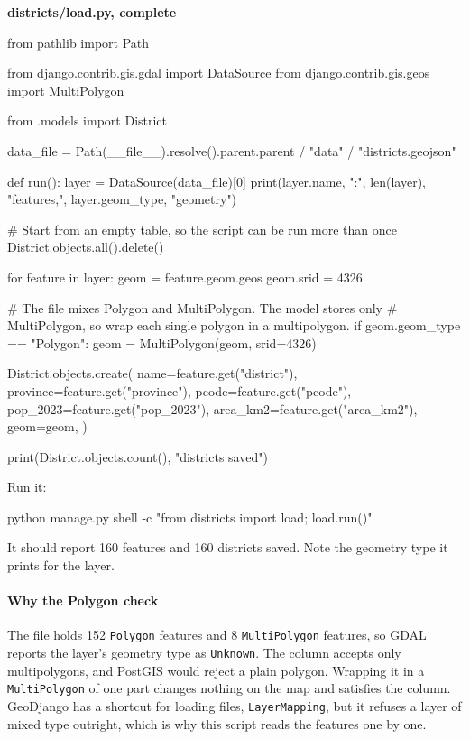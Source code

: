 \documentclass{article}
\newcommand{\cd}[1]{\texttt{#1}}
\newcommand{\codecap}[1]{%
  \par\vspace{.9em}\noindent\textbf{#1}\par\vspace{-.6em}}
\begin{document}
\codecap{districts/load.py, complete}
\begin{code}
from pathlib import Path

from django.contrib.gis.gdal import DataSource
from django.contrib.gis.geos import MultiPolygon

from .models import District

data_file = Path(__file__).resolve().parent.parent / "data" / "districts.geojson"


def run():
    layer = DataSource(data_file)[0]
    print(layer.name, ":", len(layer), "features,", layer.geom_type, "geometry")

    # Start from an empty table, so the script can be run more than once
    District.objects.all().delete()

    for feature in layer:
        geom = feature.geom.geos
        geom.srid = 4326

        # The file mixes Polygon and MultiPolygon. The model stores only
        # MultiPolygon, so wrap each single polygon in a multipolygon.
        if geom.geom_type == "Polygon":
            geom = MultiPolygon(geom, srid=4326)

        District.objects.create(
            name=feature.get("district"),
            province=feature.get("province"),
            pcode=feature.get("pcode"),
            pop_2023=feature.get("pop_2023"),
            area_km2=feature.get("area_km2"),
            geom=geom,
        )

    print(District.objects.count(), "districts saved")
\end{code}

Run it:

\begin{code}
python manage.py shell -c "from districts import load; load.run()"
\end{code}

It should report 160 features and 160 districts saved. Note the geometry
type it prints for the layer.

\paragraph{Why the Polygon check}
The file holds 152 \cd{Polygon} features and 8 \cd{MultiPolygon}
features, so GDAL reports the layer's geometry type as \cd{Unknown}. The
column accepts only multipolygons, and PostGIS would reject a plain
polygon. Wrapping it in a \cd{MultiPolygon} of one part changes nothing
on the map and satisfies the column. GeoDjango has a shortcut for loading
files, \cd{LayerMapping}, but it refuses a layer of mixed type outright,
which is why this script reads the features one by one.
\end{document}
